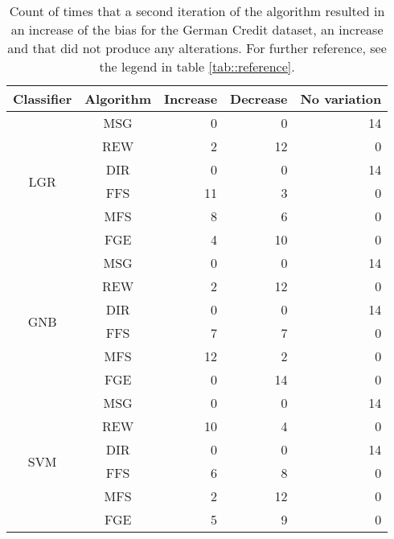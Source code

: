\begin{table}[htbp]
    \begin{center}
        \caption{Count of times that a second iteration of the algorithm resulted in an increase of the bias for the German Credit dataset, an increase and that did not produce any alterations. For further reference, see the legend in table \ref{tab::reference}.}
        \label{tab::german_credit::sex::multiple_iterations}
            \begin{tabular}{|c|c|r|r|r|}
                \hline
                \multirow{1}{*}{Classifier} & \multirow{1}{*}{Algorithm} & \multicolumn{1}{c|}{Increase} & \multicolumn{1}{c|}{Decrease} & \multicolumn{1}{c|}{No variation} \\
                \hline

                \multirow{6}{*}{LGR} & MSG & 0 & 0 & 14 \\
                \cline{2-5}
                    & REW & 2 & 12 & 0 \\
                \cline{2-5}
                    & DIR & 0 & 0 & 14 \\
                \cline{2-5}
                    & FFS & 11 & 3 & 0 \\
                \cline{2-5}
                    & MFS & 8 & 6 & 0 \\
                \cline{2-5}
                    & FGE & 4 & 10 & 0 \\
                \cline{1-5}

                \multirow{6}{*}{GNB} & MSG & 0 & 0 & 14 \\
                \cline{2-5}
                    & REW & 2 & 12 & 0 \\
                \cline{2-5}
                    & DIR & 0 & 0 & 14 \\
                \cline{2-5}
                    & FFS & 7 & 7 & 0 \\
                \cline{2-5}
                    & MFS & 12 & 2 & 0 \\
                \cline{2-5}
                    & FGE & 0 & 14 & 0 \\
                \cline{1-5}

                \multirow{6}{*}{SVM} & MSG & 0 & 0 & 14 \\
                \cline{2-5}
                    & REW & 10 & 4 & 0 \\
                \cline{2-5}
                    & DIR & 0 & 0 & 14 \\
                \cline{2-5}
                    & FFS & 6 & 8 & 0 \\
                \cline{2-5}
                    & MFS & 2 & 12 & 0 \\
                \cline{2-5}
                    & FGE & 5 & 9 & 0 \\
                \cline{1-5}


\end{tabular}
\end{center}
\end{table}
